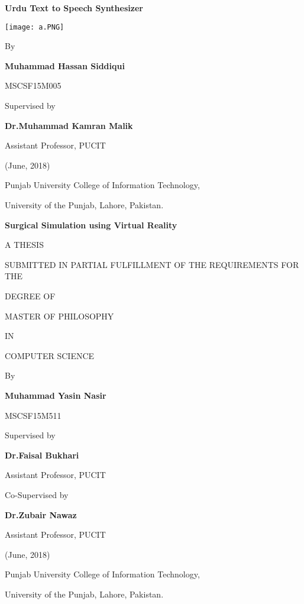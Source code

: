 


\begin{center}
\Large{\textbf{Urdu Text to Speech Synthesizer}}

\end{center}
\bigskip

\begin{center}
    

\texttt{[image: a.PNG]}
\end{center}

\begin{center}
    

    By
    
\bigskip    
\large{\textbf{Muhammad Hassan Siddiqui}}

\bigskip
\large{MSCSF15M005}

\bigskip
Supervised by

\bigskip
\large{\textbf{Dr.Muhammad Kamran Malik}}


\bigskip
Assistant Professor, PUCIT

\bigskip
(June, 2018)

\bigskip
Punjab University College of Information Technology,

\bigskip
University of the Punjab, Lahore, Pakistan. 

\end{center}

\newpage
\begin{center}
\Large{\textbf{Surgical Simulation using Virtual Reality}}



A THESIS

SUBMITTED IN PARTIAL FULFILLMENT OF THE REQUIREMENTS FOR THE 

DEGREE OF

MASTER OF PHILOSOPHY

IN

COMPUTER SCIENCE

\bigskip

    By
    
\large{\textbf{Muhammad Yasin Nasir}}

\large{MSCSF15M511}

\bigskip
Supervised by

\large{\textbf{Dr.Faisal Bukhari}}

Assistant Professor, PUCIT

\bigskip
Co-Supervised by

\large{\textbf{Dr.Zubair Nawaz}}

Assistant Professor, PUCIT

\bigskip
(June, 2018)

\bigskip
Punjab University College of Information Technology,

\bigskip
University of the Punjab, Lahore, Pakistan. 

\end{center}
\bigskip


